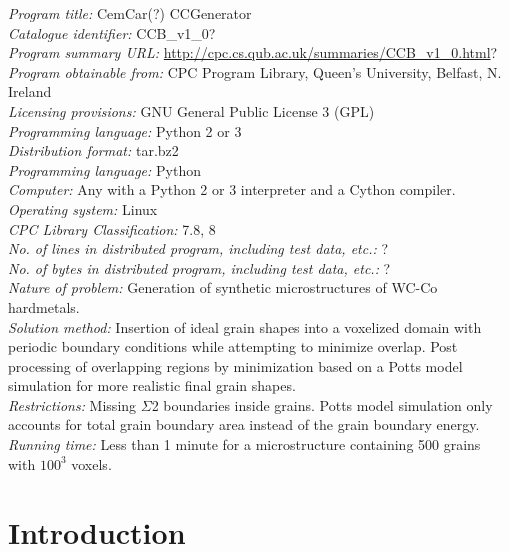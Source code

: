 \documentclass[3p,12pt]{elsarticle}
\begin{document}
\textit{Program title:} CemCar(?) CCGenerator
\\
\textit{Catalogue identifier:} CCB\_v1\_0?
\\
\textit{Program summary URL:} \url{http://cpc.cs.qub.ac.uk/summaries/CCB_v1_0.html}?
\\
\textit{Program obtainable from:} CPC Program Library, Queen’s University, Belfast, N. Ireland
\\
\textit{Licensing provisions:} GNU General Public License 3 (GPL)
\\
\textit{Programming language:} Python 2 or 3
\\
\textit{Distribution format:} tar.bz2
\\
\textit{Programming language:} Python 
\\
\textit{Computer:} Any with a Python 2 or 3 interpreter and a Cython compiler.
\\
\textit{Operating system:} Linux
\\
\textit{CPC Library Classification:} 7.8, 8
\\
\textit{No. of lines in distributed program, including test data, etc.:} ?
\\
\textit{No. of bytes in distributed program, including test data, etc.:} ?
\\
\textit{Nature of problem:}
Generation of synthetic microstructures of WC-Co hardmetals.
\\
\textit{Solution method:}
Insertion of ideal grain shapes into a voxelized domain with periodic boundary conditions while attempting to minimize overlap.
Post processing of overlapping regions by minimization based on a Potts model simulation for more realistic final grain shapes.
\\
\textit{Restrictions:}
Missing $\Sigma$2 boundaries inside grains. Potts model simulation only accounts for total grain boundary area instead of the grain boundary energy. 
\\
\textit{Running time:}
Less than 1 minute for a microstructure containing 500 grains with $100^3$ voxels.



\section{Introduction}

\end{document}
